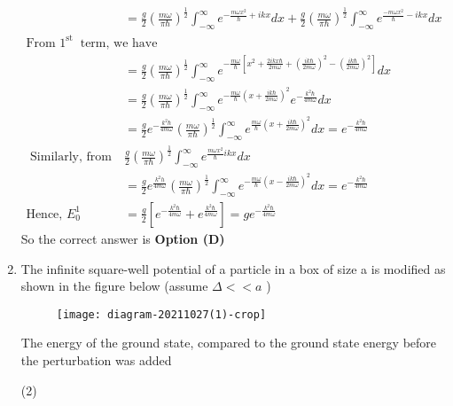 \begin{enumerate}
\begin{answer}
$$\begin{aligned}
&=\frac{g}{2}\left(\frac{m \omega}{\pi \hbar}\right)^{\frac{1}{2}} \int_{-\infty}^{\infty} e^{-\frac{m \omega x^{2}}{\hbar}+i k x} d x+\frac{g}{2}\left(\frac{m \omega}{\pi \hbar}\right)^{\frac{1}{2}} \int_{-\infty}^{\infty} e^{\frac{-m \omega x^{2}}{\hbar}-i k x} d x\\
\text{From $1^{\text {st }}$ term, we have}\\
&=\frac{g}{2}\left(\frac{m \omega}{\pi \hbar}\right)^{\frac{1}{2}} \int_{-\infty}^{\infty} e^{-\frac{m \omega}{\hbar}\left[x^{2}+\frac{2 i k x \hbar}{2 m \omega}+\left(\frac{i k \hbar}{2 m \omega}\right)^{2}-\left(\frac{i k \hbar}{2 m \omega}\right)^{2}\right]} d x\\&=\frac{g}{2}\left(\frac{m \omega}{\pi \hbar}\right)^{\frac{1}{2}} \int_{-\infty}^{\infty} e^{-\frac{m \omega}{\hbar}\left(x+\frac{i k \hbar}{2 m \omega}\right)^{2}} e^{-\frac{k^{2} \hbar}{4 m \omega}} d x\\
&=\frac{g}{2} e^{-\frac{k^{2} \hbar}{4 m \omega}}\left(\frac{m \omega}{\pi \hbar}\right)^{\frac{1}{2}} \int_{-\infty}^{\infty} e^{\frac{m \omega}{\hbar}\left(x+\frac{i k \hbar}{2 m \omega}\right)^{2}} d x=e^{-\frac{k^{2} \hbar}{4 m \omega}}\\
\text{	Similarly, from term (ii), }&\frac{g}{2}\left(\frac{m \omega}{\pi \hbar}\right)^{\frac{1}{2}} \int_{-\infty}^{\infty} e^{\frac{m \omega x^{2}}{\hbar} i k x} d x\\
&=\frac{g}{2} e^{\frac{k^{2} h}{4 m \omega}}\left(\frac{m \omega}{\pi \hbar}\right)^{\frac{1}{2}} \int_{-\infty}^{\infty} e^{-\frac{m \omega}{\hbar}\left(x-\frac{i k \hbar}{2 m \omega}\right)^{2}} d x=e^{-\frac{k^{2} \hbar}{4 m \omega}}\\
\text{Hence, }E_{0}^{1}&=\frac{g}{2}\left[e^{-\frac{k^{2} \hbar}{4 m \omega}}+e^{\frac{k^{2} \hbar}{4 m \omega}}\right]=g e^{-\frac{k^{2} \hbar}{4 m \omega}}
\end{aligned}
$$
So the correct answer is \textbf{Option (D)}
\end{answer}
\item The infinite square-well potential of a particle in a box of size a is modified as shown in the figure below (assume $\Delta<<a$ )\\
\begin{figure}[H]
	\centering
	\texttt{[image: diagram-20211027(1)-crop]}
\end{figure}
The energy of the ground state, compared to the ground state energy before the perturbation was added
{}
\begin{tasks}(2)

\end{tasks}
\end{enumerate}
